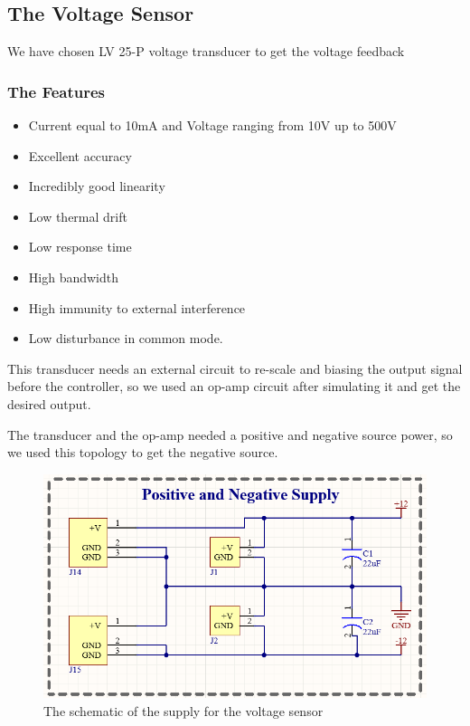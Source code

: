 \documentclass[12pt,a4paper]{book}
\begin{document}
\subsection{The Voltage Sensor}
We have chosen LV 25-P voltage transducer to get the voltage feedback

\subsubsection{The Features}
\begin{itemize}
  \item Current equal to 10mA and Voltage ranging from 10V up to 500V
  \item Excellent accuracy
  \item	Incredibly good linearity
  \item	Low thermal drift
  \item	Low response time
  \item	High bandwidth
  \item	High immunity to external interference
  \item	Low disturbance in common mode.
\end{itemize}
This transducer needs an external circuit to re-scale and biasing the output signal before the controller, so we used an op-amp circuit after simulating it and get the desired output.

The transducer and the op-amp needed a positive and negative source power, so we used this topology to get the negative source.
\begin{figure}[h!]
  \centering
  \includegraphics[width = 12cm]{image38.png}
  \caption{The schematic of the supply for the voltage sensor}
  \label{fig:image38}
\end{figure}
\end{document}
